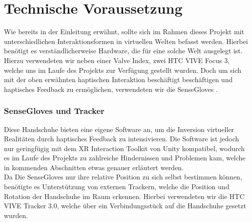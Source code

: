 \section{Technische Voraussetzung}
Wie bereits in der Einleitung erwähnt, sollte sich im Rahmen dieses Projekt mit unterschiedlichen Interaktionsformen in virtuellen Welten befasst werden. Hierbei benötigt es verständlicherweise Hardware, die für eine solche Welt ausgelegt ist. Hierzu verwendeten wir neben einer Valve Index, zwei HTC VIVE Focus 3, welche uns im Laufe des Projekts zur Verfügung gestellt wurden. Doch um sich mit der oben erwähnten haptischen Interaktion beschäftigt beschäftigen und haptisches Feedback zu ermöglichen, verwendeten wir die \dq SenseGloves \dq. 

\subsubsection{SenseGloves und Tracker}
Diese Handschuhe bieten eine eigene Software an, um die Inversion virtueller Realitäten durch haptisches Feedback zu intensivieren. Die Software ist jedoch nur geringfügig mit dem XR Interaction Toolkit von Unity kompatibel, wodurch es im Laufe des Projekts zu zahlreiche Hindernissen und Problemen kam, welche in kommenden Abschnitten etwas genauer erläutert werden.\\ 
Da Die SenseGloves nur ihre relative Position zu sich selbst bestimmen können, benötigte es Unterstützung von externen Trackern, welche die Position und Rotation der Handschuhe im Raum erkennen. Hierbei verwendeten wir die \dq HTC VIVE Tracker 3.0\dq, welche über ein Verbindungsstück auf die Handschuhe gesetzt wurden.\\

